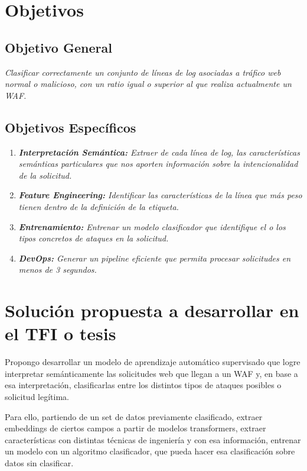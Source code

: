 \documentclass[12pt, a4paper]{article}
\begin{document}
\section{Objetivos}

\subsection{Objetivo General}

\vspace{0.2cm}
\noindent \textit{Clasificar correctamente un conjunto de líneas de log asociadas a tráfico web normal o malicioso, con un ratio igual o superior al que realiza actualmente un WAF.}

\subsection{Objetivos Específicos}

\begin{enumerate}
    \item \textit{\textbf{Interpretación Semántica:} Extraer de cada línea de log, las características semánticas particulares que nos aporten información sobre la intencionalidad de la solicitud.}
    \item \textit{\textbf{Feature Engineering:} Identificar las características de la línea que más peso tienen dentro de la definición de la etiqueta.}
    \item \textit{\textbf{Entrenamiento:} Entrenar un modelo clasificador que identifique el o los tipos concretos de ataques en la solicitud.}
    \item \textit{\textbf{DevOps:} Generar un pipeline eficiente que permita procesar solicitudes en menos de 3 segundos.}
\end{enumerate}

\section{Solución propuesta a desarrollar en el TFI o tesis}
Propongo desarrollar un modelo de aprendizaje automático supervisado que logre interpretar semánticamente las solicitudes web que llegan a un WAF y, en base a esa interpretación, clasificarlas entre los distintos tipos de ataques posibles o solicitud legítima.

Para ello, partiendo de un set de datos previamente clasificado, extraer embeddings de ciertos campos a partir de modelos transformers, extraer características con distintas técnicas de ingeniería y con esa información, entrenar un modelo con un algoritmo clasificador, que pueda hacer esa clasificación sobre datos sin clasificar.
\end{document}
